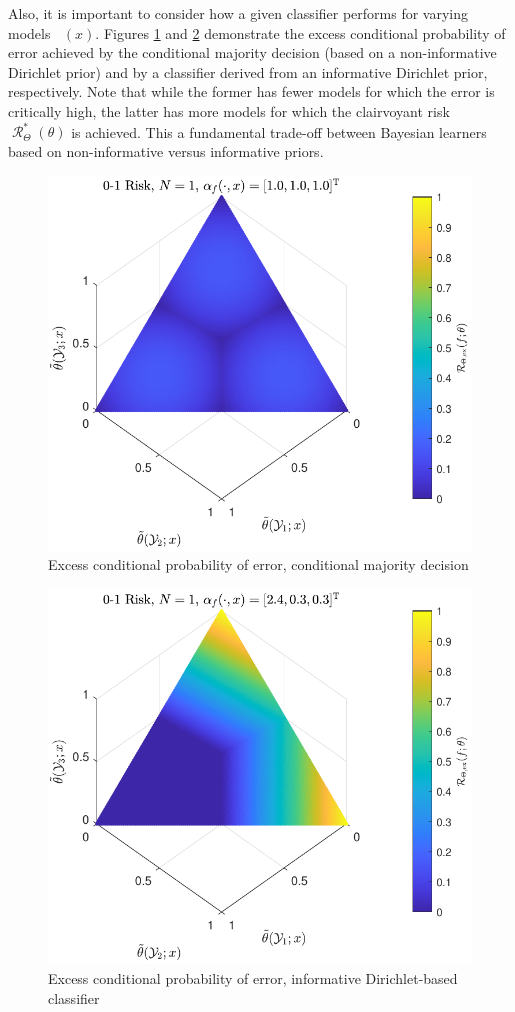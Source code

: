 \documentclass[12pt]{report}
\DeclareMathOperator{\Rcal}{\mathcal{R}}
\DeclareMathOperator{\thetac}{\theta_\text{c}}
\begin{document}
Also, it is important to consider how a given classifier performs for varying models $\thetac(x)$. Figures \ref{fig:Risk_cond_ex_01_Dir_theta__uni} and \ref{fig:Risk_cond_ex_01_Dir_theta__subj} demonstrate the excess conditional probability of error achieved by the conditional majority decision (based on a non-informative Dirichlet prior) and by a classifier derived from an informative Dirichlet prior, respectively. Note that while the former has fewer models for which the error is critically high, the latter has more models for which the clairvoyant risk $\Rcal_{\Theta}^*(\theta)$ is achieved. This a fundamental trade-off between Bayesian learners based on non-informative versus informative priors.
\begin{figure}
\centering
\includegraphics[width=0.7\linewidth]{Risk_cond_ex_01_Dir_theta__uni.pdf}
\caption{Excess conditional probability of error, conditional majority decision}
\label{fig:Risk_cond_ex_01_Dir_theta__uni}
\end{figure}
%
\begin{figure}
\centering
\includegraphics[width=0.7\linewidth]{Risk_cond_ex_01_Dir_theta__subj.pdf}
\caption{Excess conditional probability of error, informative Dirichlet-based classifier}
\label{fig:Risk_cond_ex_01_Dir_theta__subj}
\end{figure}
\end{document}

